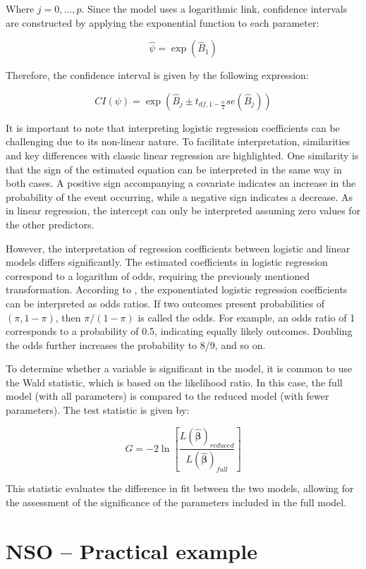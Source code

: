 \documentclass[
  12pt,
]{book}
\begin{document}
Where \(j=0,\dots,p\). Since the model uses a logarithmic link, confidence intervals are constructed by applying the exponential function to each parameter:

\[
\hat{\psi}=\exp\left(\hat{B}_{1}\right)
\]

Therefore, the confidence interval is given by the following expression:

\[
CI\left(\psi\right)=\exp\left(\hat{B}_{j}\pm t_{df,1-\frac{\alpha}{2}}se\left(\hat{B}_{j}\right)\right)
\]

It is important to note that interpreting logistic regression coefficients can be challenging due to its non-linear nature. To facilitate interpretation, similarities and key differences with classic linear regression are highlighted. One similarity is that the sign of the estimated equation can be interpreted in the same way in both cases. A positive sign accompanying a covariate indicates an increase in the probability of the event occurring, while a negative sign indicates a decrease. As in linear regression, the intercept can only be interpreted assuming zero values for the other predictors.

However, the interpretation of regression coefficients between logistic and linear models differs significantly. The estimated coefficients in logistic regression correspond to a logarithm of odds, requiring the previously mentioned transformation. According to \citet{gelmanhill2019}, the exponentiated logistic regression coefficients can be interpreted as odds ratios. If two outcomes present probabilities of \((\pi,1-\pi)\), then \(\pi/(1-\pi)\) is called the odds. For example, an odds ratio of 1 corresponds to a probability of 0.5, indicating equally likely outcomes. Doubling the odds further increases the probability to 8/9, and so on.

To determine whether a variable is significant in the model, it is common to use the Wald statistic, which is based on the likelihood ratio. In this case, the full model (with all parameters) is compared to the reduced model (with fewer parameters). The test statistic is given by:

\[
G=-2\ln\left[\frac{L\left(\hat{\boldsymbol{\beta}}\right)_{reduced}}{L\left(\hat{\boldsymbol{\beta}}\right)_{full}}\right]
\]

This statistic evaluates the difference in fit between the two models, allowing for the assessment of the significance of the parameters included in the full model.

\hypertarget{nso-practical-example-2}{%
\section{NSO -- Practical example}\label{nso-practical-example-2}}
\end{document}
